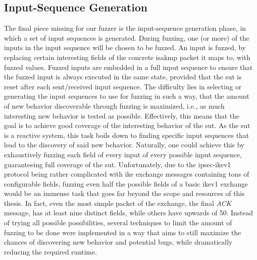 \subsection{Input-Sequence Generation} \label{subsec:sequence_generation}
The final piece missing for our fuzzer is the input-sequence generation phase, in which a set of input sequences is generated. During fuzzing, one (or more) of the inputs in the input sequence will be chosen to be fuzzed. An input is fuzzed, by replacing certain interesting fields of the concrete \ac{isakmp} packet it maps to, with fuzzed values. Fuzzed inputs are embedded in a full input sequence to ensure that the fuzzed input is always executed in the same state, provided that the \ac{sut} is reset after each sent/received input sequence. The difficulty lies in selecting or generating the input sequences to use for fuzzing in such a way, that the amount of new behavior discoverable through fuzzing is maximized, i.e., as much interesting new behavior is tested as possible. Effectively, this means that the goal is to achieve good coverage of the interesting behavior of the \ac{sut}. As the \ac{sut} is a reactive system, this task boils down to finding specific input sequences that lead to the discovery of said new behavior. Naturally, one could achieve this by exhaustively fuzzing each field of every input of every possible input sequence, guaranteeing full coverage of the \ac{sut}. Unfortunately, due to the \ac{ipsec}-\ac{ike}v1 protocol being rather complicated with \ac{ike} exchange messages containing tons of configurable fields, fuzzing even half the possible fields of a basic \ac{ike}v1 exchange would be an immense task that goes far beyond the scope and resources of this thesis. In fact, even the most simple packet of the exchange, the final \emph{ACK} message, has at least nine distinct fields, while others have upwards of 50. Instead of trying all possible possibilities, several techniques to limit the amount of fuzzing to be done were implemented in a way that aims to still maximize the chances of discovering new behavior and potential bugs, while dramatically reducing the required runtime. 

